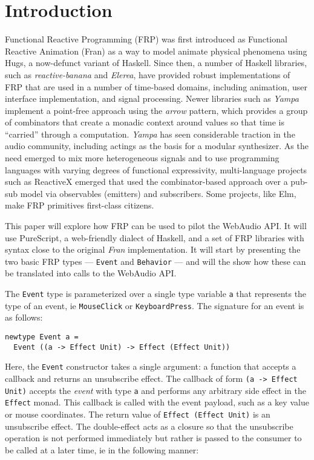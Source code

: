 \documentclass{sig-alternate}
\begin{document}
\begin{sloppypar}
  \section{Introduction}
  Functional Reactive Programming (FRP) was first introduced as Functional Reactive Animation\cite{elliott1997functional} (Fran) as a way to model animate physical phenomena using Hugs, a now-defunct variant of Haskell.  Since then, a number of Haskell libraries, such as \textit{reactive-banana} and \textit{Elerea}, have provided robust implementations of FRP that are used in a number of time-based domains, including animation, user interface implementation, and signal processing.  Newer libraries such as \textit{Yampa} implement a point-free approach using the \textit{arrow} pattern, which provides a group of combinators that create a monadic context around values so that time is ``carried'' through a computation.  \textit{Yampa} has seen considerable traction in the audio community, including actings as the basis for a modular synthesizer.\cite{giorgidze2008switched}  As the need emerged to mix more heterogeneous signals and to use programming languages with varying degrees of functional expressivity, multi-language projects such as ReactiveX emerged that used the combinator-based approach over a pub-sub model via observables (emitters) and subscribers.\cite{maglie2016reactivex} Some projects, like Elm, make FRP primitives first-class citizens\cite{czaplicki2013asynchronous}.


  This paper will explore how FRP can be used to pilot the WebAudio API. It will use PureScript, a web-friendly dialect of Haskell, and a set of FRP libraries with syntax close to the original \textit{Fran} implementation.  It will start by presenting the two basic FRP types --- \texttt{Event} and
  \texttt{Behavior} --- and will the show how these can be translated into calls to the WebAudio API.

  The \texttt{Event} type is parameterized over a single type variable \texttt{a} that represents the type of an event, ie \texttt{MouseClick} or \texttt{KeyboardPress}.  The signature for an event is as follows:

  \begin{verbatim}
newtype Event a =
  Event ((a -> Effect Unit) -> Effect (Effect Unit))
       \end{verbatim}

  Here, the \texttt{Event} constructor takes a single argument: a function that accepts a callback and returns an unsubscribe effect. The callback of form \verb=(a -> Effect Unit)= accepts the \textit{event} with type \texttt{a} and performs any arbitrary side effect in the \texttt{Effect} monad.  This callback is called with the event payload, such as a key value or mouse coordinates.  The return value of \texttt{Effect (Effect Unit)} is an unsubscribe effect.  The double-effect acts as a closure so that the unsubscribe operation is not performed immediately but rather is passed to the consumer to be called at a later time, ie in the following manner:


\end{sloppypar}
\end{document}
